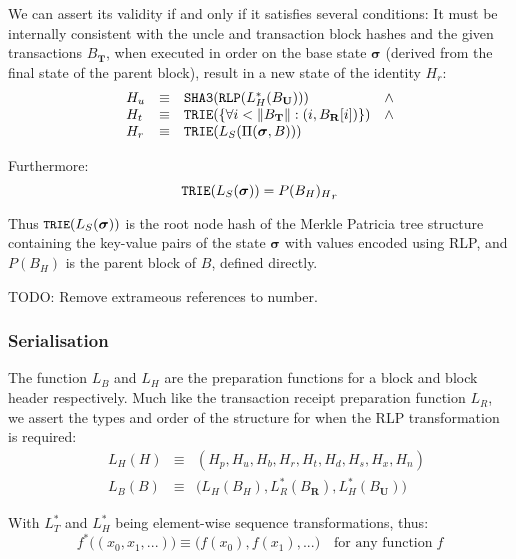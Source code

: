 \documentclass[9pt,oneside]{amsart}
\begin{document}
\begin{multicols}{2}
We can assert its validity if and only if it satisfies several conditions: It must be internally consistent with the uncle and transaction block hashes and the given transactions $B_\mathbf{T}$, when executed in order on the base state $\boldsymbol{\sigma}$ (derived from the final state of the parent block), result in a new state of the identity $H_r$:
\begin{equation}
\begin{array}[t]{lclc}
H_u &\equiv& \mathtt{\small SHA3}(\mathtt{\small RLP}(L_H^*(B_\mathbf{U}))) & \wedge \\
H_t &\equiv& \mathtt{\small TRIE}(\{\forall i < \lVert B_\mathbf{T} \rVert: (i, B_\mathbf{R}[i])\}) & \wedge \\
H_r &\equiv& \mathtt{\small TRIE}(L_S(\Pi(\boldsymbol{\sigma}, B))) &
\end{array}
\end{equation}

Furthermore:
\begin{equation}
\mathtt{\small TRIE}(L_S(\boldsymbol{\sigma})) = {P(B_H)_H}_r
\end{equation}

Thus $\texttt{\small TRIE}(L_S(\boldsymbol{\sigma}))$ is the root node hash of the Merkle Patricia tree structure containing the key-value pairs of the state $\boldsymbol{\sigma}$ with values encoded using RLP, and $P(B_H)$ is the parent block of $B$, defined directly.

TODO: Remove extrameous references to number.

\subsubsection{Serialisation}

The function $L_B$ and $L_H$ are the preparation functions for a block and block header respectively. Much like the transaction receipt preparation function $L_R$, we assert the types and order of the structure for when the RLP transformation is required:
\begin{eqnarray}
\quad L_H(H) & \equiv & (H_p, H_u, H_b, H_r, H_t, H_d, H_s, H_x, H_n) \\
\quad L_B(B) & \equiv & \big( L_H(B_H), L_R^*(B_\mathbf{R}), L_H^*(B_\mathbf{U}) \big)
\end{eqnarray}

With $L_T^*$ and $L_H^*$ being element-wise sequence transformations, thus:
\begin{equation}
f^*\big( (x_0, x_1, ...) \big) \equiv \big( f(x_0), f(x_1), ... \big) \quad \text{for any function} \; f
\end{equation}


\end{multicols}
\end{document}
